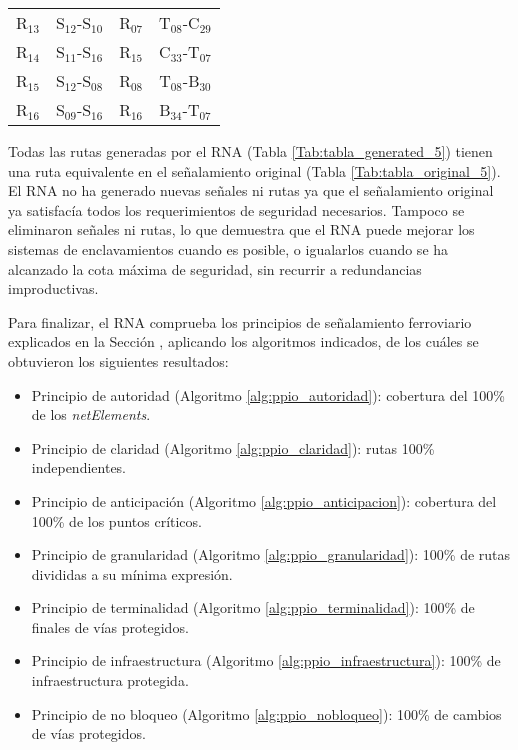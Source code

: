 \begin{table}[!h]
{{\begin{tabular}{ c c c c }
                    R$_{13}$ & S$_{12}$-S$_{10}$ & R$_{07}$ & T$_{08}$-C$_{29}$ \\
                    R$_{14}$ & S$_{11}$-S$_{16}$ & R$_{15}$ & C$_{33}$-T$_{07}$ \\
                    R$_{15}$ & S$_{12}$-S$_{08}$ & R$_{08}$ & T$_{08}$-B$_{30}$ \\
                    R$_{16}$ & S$_{09}$-S$_{16}$ & R$_{16}$ & B$_{34}$-T$_{07}$ \\
                \hline
            \end{tabular}
     		}
        }    
    \end{table}
    
    Todas las rutas generadas por el RNA (Tabla \ref{Tab:tabla_generated_5}) tienen una ruta equivalente en el señalamiento original (Tabla \ref{Tab:tabla_original_5}). El RNA no ha generado nuevas señales ni rutas ya que el señalamiento original ya satisfacía todos los requerimientos de seguridad necesarios. Tampoco se eliminaron señales ni rutas, lo que demuestra que el RNA puede mejorar los sistemas de enclavamientos cuando es posible, o igualarlos cuando se ha alcanzado la cota máxima de seguridad, sin recurrir a redundancias improductivas.
    
    Para finalizar, el RNA comprueba los principios de señalamiento ferroviario explicados en la Sección \label{sec:validar_principios}, aplicando los algoritmos indicados, de los cuáles se obtuvieron los siguientes resultados:
    
    \begin{itemize}
    	\item Principio de autoridad (Algoritmo \ref{alg:ppio_autoridad}): cobertura del 100\% de los \textit{netElements}.
    	\item Principio de claridad (Algoritmo \ref{alg:ppio_claridad}): rutas 100\% independientes.
    	\item Principio de anticipación (Algoritmo \ref{alg:ppio_anticipacion}): cobertura del 100\% de los puntos críticos.
    	\item Principio de granularidad (Algoritmo \ref{alg:ppio_granularidad}): 100\% de rutas divididas a su mínima expresión.
    	\item Principio de terminalidad (Algoritmo \ref{alg:ppio_terminalidad}): 100\% de finales de vías protegidos.
    	\item Principio de infraestructura (Algoritmo \ref{alg:ppio_infraestructura}): 100\% de infraestructura protegida.
    	\item Principio de no bloqueo (Algoritmo \ref{alg:ppio_nobloqueo}): 100\% de cambios de vías protegidos.
    \end{itemize}	